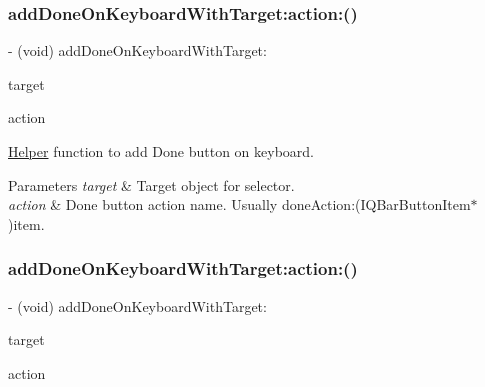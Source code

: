 \subsubsection{\texorpdfstring{add\+Done\+On\+Keyboard\+With\+Target\+:action\+:()}{addDoneOnKeyboardWithTarget:action:()}\hspace{0.1cm}{\footnotesize\ttfamily [2/3]}}
{\footnotesize\ttfamily -\/ (void) add\+Done\+On\+Keyboard\+With\+Target\+: \begin{DoxyParamCaption}\item[{(nullable id)}]{target }\item[{action:(nullable S\+EL)}]{action }\end{DoxyParamCaption}}

\mbox{\hyperlink{interface_helper}{Helper}} function to add Done button on keyboard.


\begin{DoxyParams}{Parameters}
{\em target} & Target object for selector. \\
\hline
{\em action} & Done button action name. Usually \textquotesingle{}done\+Action\+:(\+I\+Q\+Bar\+Button\+Item$\ast$)item\textquotesingle{}. \\
\hline
\end{DoxyParams}
\mbox{\label{category_u_i_view_07_i_q_toolbar_addition_08_a8c336246bb1305d5c6deb01df86739aa}} 
\subsubsection{\texorpdfstring{add\+Done\+On\+Keyboard\+With\+Target\+:action\+:()}{addDoneOnKeyboardWithTarget:action:()}\hspace{0.1cm}{\footnotesize\ttfamily [3/3]}}
{\footnotesize\ttfamily -\/ (void) add\+Done\+On\+Keyboard\+With\+Target\+: \begin{DoxyParamCaption}\item[{(nullable id)}]{target }\item[{action:(nullable S\+EL)}]{action }\end{DoxyParamCaption}}

